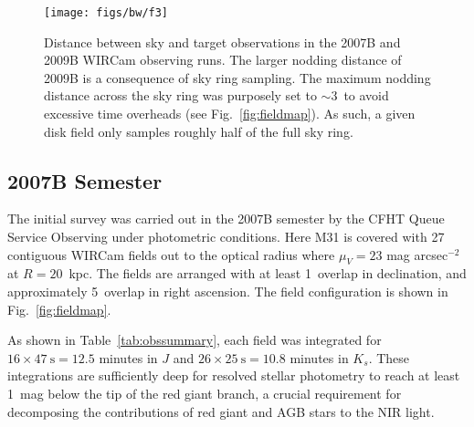 \documentclass[iop,tighten]{emulateapj}
\newcommand{\Fig}[1]{Fig.~\ref{fig:#1}}  %
\begin{document}
\begin{figure}[t]
\centering
\texttt{[image: figs/bw/f3]}
\caption{Distance between sky and target observations in the 2007B and 2009B WIRCam observing runs.
The larger nodding distance of 2009B is a consequence of sky ring sampling.
The maximum nodding distance across the sky ring was purposely set to $\sim 3$\arcdeg\ to avoid excessive time overheads (see \Fig{fieldmap}).
As such, a given disk field only samples roughly half of the full sky ring.}
\label{fig:sky_target_dist}
\end{figure}


\subsection{2007B Semester}
\label{sec:obs7}

The initial survey was carried out in the 2007B semester by the CFHT Queue Service Observing under photometric conditions.
Here M31 is covered with 27 contiguous WIRCam fields out to the optical radius where $\mu_V=23$ mag arcsec$^{-2}$ at $R=20$~kpc.
The fields are arranged with at least 1\arcmin\ overlap in declination, and approximately 5\arcmin\ overlap in right ascension.
The field configuration is shown in \Fig{fieldmap}.

As shown in Table~\ref{tab:obssummary}, each field was integrated for $16\times 47~\mathrm{s} = 12.5$ minutes in $J$ and $26\times 25~\mathrm{s} = 10.8$ minutes in $K_s$.
These integrations are sufficiently deep for resolved stellar photometry to reach at least 1~mag below the tip of the red giant branch, a crucial requirement for decomposing the contributions of red giant and AGB stars to the NIR light.
\end{document}
